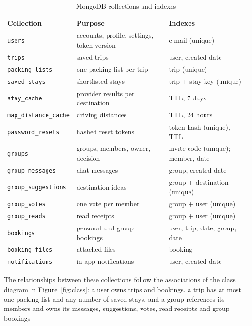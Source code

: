 \begin{table}[htbp]
\centering
\begin{tabular}{|L{0.25\textwidth}|L{0.36\textwidth}|L{0.29\textwidth}|}
  \hline
  \textbf{Collection} & \textbf{Purpose} & \textbf{Indexes} \\
  \hline
  \texttt{users} & accounts, profile, settings, token version
    & e-mail (unique) \\
  \hline
  \texttt{trips} & saved trips & user, created date \\
  \hline
  \texttt{packing\_lists} & one packing list per trip & trip (unique) \\
  \hline
  \texttt{saved\_stays} & shortlisted stays & trip + stay key (unique) \\
  \hline
  \texttt{stay\_cache} & provider results per destination
    & TTL, 7 days \\
  \hline
  \texttt{map\_distance\_cache} & driving distances & TTL, 24 hours \\
  \hline
  \texttt{password\_resets} & hashed reset tokens
    & token hash (unique), TTL \\
  \hline
  \texttt{groups} & groups, members, owner, decision
    & invite code (unique); member, date \\
  \hline
  \texttt{group\_messages} & chat messages & group, created date \\
  \hline
  \texttt{group\_suggestions} & destination ideas
    & group + destination (unique) \\
  \hline
  \texttt{group\_votes} & one vote per member & group + user (unique) \\
  \hline
  \texttt{group\_reads} & read receipts & group + user (unique) \\
  \hline
  \texttt{bookings} & personal and group bookings
    & user, trip, date; group, date \\
  \hline
  \texttt{booking\_files} & attached files & booking \\
  \hline
  \texttt{notifications} & in-app notifications & user, created date \\
  \hline
\end{tabular}
\caption{MongoDB collections and indexes}
\label{tab:collections}
\end{table}

The relationships between these collections follow the associations of the
class diagram in Figure~\ref{fig:class}: a user owns trips and bookings, a
trip has at most one packing list and any number of saved stays, and a
group references its members and owns its messages, suggestions, votes,
read receipts and group bookings.

